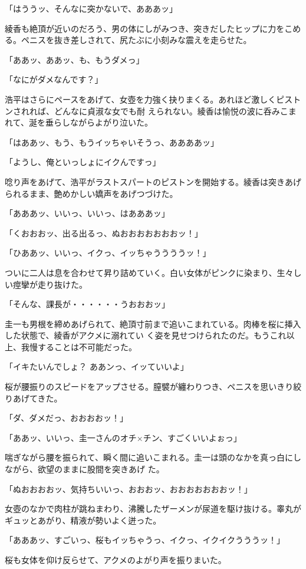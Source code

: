 ﻿\documentclass[book,tate]{jlreq}
\begin{document}
「はううッ、そんなに突かないで、あああッ」

綾香も絶頂が近いのだろう、男の体にしがみつき、突きだしたヒップに力をこめる。ペニスを抜き差しされて、尻たぶに小刻みな震えを走らせた。

「ああッ、ああッ、も、もうダメっ」

「なにがダメなんです？」

浩平はさらにペースをあげて、女壺を力強く抉りまくる。あれほど激しくピストンされれば、どんなに貞淑な女でも耐 えられない。綾香は愉悦の波に呑みこまれて、涎を垂らしながらよがり泣いた。

「はああッ、もう、もうイッちゃいそうっ、ああああッ」

「ようし、俺といっしょにイクんですっ」

唸り声をあげて、浩平がラストスパートのピストンを開始する。綾香は突きあげられるまま、艶めかしい嬌声をあげつづけた。

「あああッ、いいっ、いいっ、はあああッ」

「くおおおッ、出る出るっ、ぬおおおおおおおッ！」

「ひああッ、いいっ、イクっ、イッちゃううううッ！」

ついに二人は息を合わせて昇り詰めていく。白い女体がピンクに染まり、生々しい痙攣が走り抜けた。

「そんな、課長が・・・・・・うおおおッ」

圭一も男根を締めあげられて、絶頂寸前まで追いこまれている。肉棒を桜に挿入した状態で、綾香がアクメに溺れてい く姿を見せつけられたのだ。もうこれ以上、我慢することは不可能だった。

「イキたいんでしょ？ ああンっ、イッていいよ」

桜が腰振りのスピードをアップさせる。膣襞が纏わりつき、ペニスを思いきり絞りあげてきた。

「ダ、ダメだっ、おおおおッ！」

「ああッ、いいっ、圭一さんのオチ×チン、すごくいいよぉっ」

喘ぎながら腰を振られて、瞬く間に追いこまれる。圭一は頭のなかを真っ白にしながら、欲望のままに股間を突きあげ た。

「ぬおおおおッ、気持ちいいっ、おおおッ、おおおおおおおッ！」

女壺のなかで肉柱が跳ねまわり、沸騰したザーメンが尿道を駆け抜ける。睾丸がギュッとあがり、精液が勢いよく迸った。

「あああッ、すごいっ、桜もイッちゃうっ、イクっ、イクイクうううッ！」

桜も女体を仰け反らせて、アクメのよがり声を振りまいた。
\end{document}
